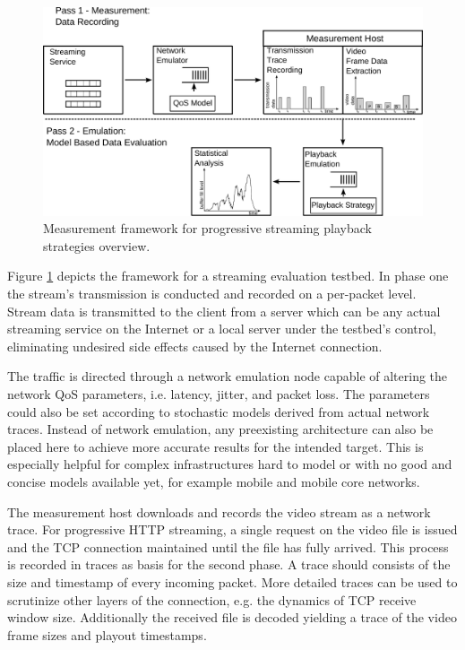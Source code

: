 \begin{figure}[htb]
    \includegraphics[width=\textwidth]{images/measurement-model.pdf}
    \caption{Measurement framework for progressive streaming playback strategies overview.}
    \label{c3:fig:framework}
\end{figure}

Figure \ref{c3:fig:framework} depicts the framework for a streaming evaluation testbed. In phase one the stream's transmission is conducted and recorded on a per-packet level. Stream data is transmitted to the client from a server which can be any actual streaming service on the Internet or a local server under the testbed's control, eliminating undesired side effects caused by the Internet connection. 

The traffic is directed through a network emulation node capable of altering the network QoS parameters, i.e. latency, jitter, and packet loss. The parameters could also be set according to stochastic models derived from actual network traces. Instead of network emulation, any preexisting architecture can also be placed here to achieve more accurate results for the intended target. This is especially helpful for complex infrastructures hard to model or with no good and concise models available yet, for example mobile and mobile core networks.

The measurement host downloads and records the video stream as a network trace. For progressive \gls{HTTP} streaming, a single request on the video file is issued and the \gls{TCP} connection maintained until the file has fully arrived.
This process is recorded in traces as basis for the second phase. A trace should consists of the size and timestamp of every incoming packet. More detailed traces can be used to scrutinize other layers of the connection, e.g. the dynamics of TCP receive window size. Additionally the received file is decoded yielding a trace of the video frame sizes and playout timestamps.

